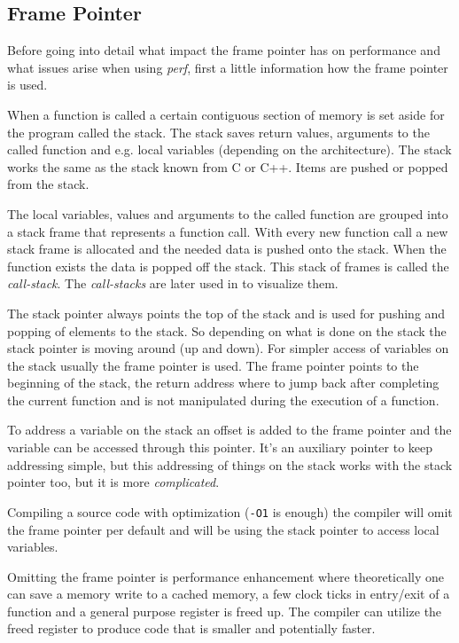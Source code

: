 \subsection[framep]{Frame Pointer}

Before going into detail what impact the frame pointer has on
performance and what issues arise when using {\em perf}, first a little
information how the frame pointer is used.

When a function is called a certain contiguous section of memory is
set aside for the program called the stack. The stack saves return
values, arguments to the called function and e.g. local variables
(depending on the architecture). The stack works the same as the stack
known from C or C++. Items are pushed or popped from the stack.

The local variables, values and arguments to the called function are
grouped into a stack frame that represents a function call. With every
new function call a new stack frame is allocated and the needed data
is pushed onto the stack. When the function exists the data is popped
off the stack. This stack of frames is called the {\em call-stack}.
The {\em call-stacks} are later used in \in[fgraph] \about[fgraph] to
visualize them.


The stack pointer always points the top of the stack and is used for
pushing and popping of elements to the stack. So depending on what is
done on the stack the stack pointer is moving around (up and
down). For simpler access of variables on the stack usually the frame
pointer is used. The frame pointer points to the beginning of the
stack, the return address where to jump back after completing the
current function and is not manipulated during the execution of a
function.

\startplacemarginfigure[ title={A sample stack that is compatible
with most architectures.}, reference=fig1]
\externalfigure[stack][marginwidth]
\stopplacemarginfigure

To address a variable on the stack an offset is added to the frame
pointer and the variable can be accessed through this pointer. It's an
auxiliary pointer to keep addressing simple, but this addressing of
things on the stack works with the stack pointer too, but it is more
{\em complicated}.

Compiling a source code with optimization ({\tt -O1} is enough) the
compiler will omit the frame pointer per default and will be using the
stack pointer to access local variables.

Omitting the frame pointer is performance enhancement where
theoretically one can save a memory write to a cached memory, a few
clock ticks in entry/exit of a function and a general purpose register
is freed up. The compiler can utilize the freed register to produce
code that is smaller and potentially faster.

